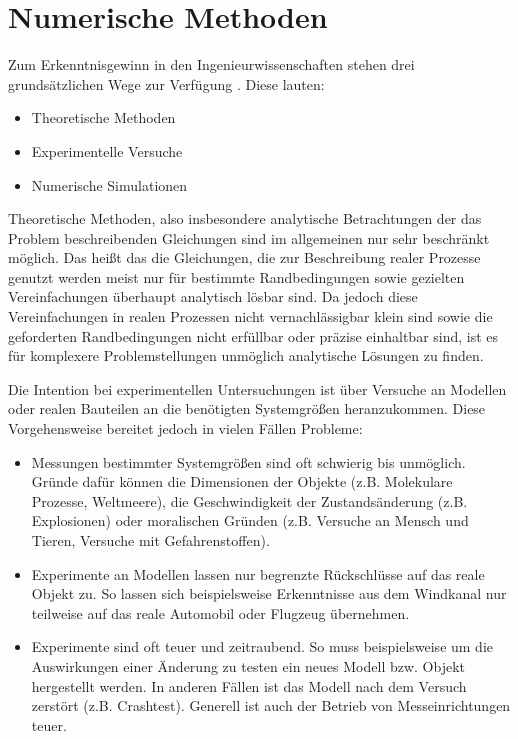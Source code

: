 \section{Numerische Methoden}

Zum Erkenntnisgewinn in den Ingenieurwissenschaften stehen drei grundsätzlichen
Wege zur Verfügung \cite{num_maschbau}. Diese lauten:
\begin{itemize}
  \item Theoretische Methoden
  \item Experimentelle Versuche
  \item Numerische Simulationen
\end{itemize}

Theoretische Methoden, also insbesondere analytische Betrachtungen der das Problem
beschreibenden Gleichungen sind im allgemeinen nur sehr beschränkt möglich. Das heißt das
die Gleichungen, die zur Beschreibung realer Prozesse genutzt werden meist nur für
bestimmte Randbedingungen sowie gezielten Vereinfachungen überhaupt analytisch lösbar
sind. Da jedoch diese Vereinfachungen in realen Prozessen nicht vernachlässigbar klein sind
sowie die geforderten Randbedingungen nicht erfüllbar oder präzise einhaltbar sind, ist es
für komplexere Problemstellungen unmöglich analytische Lösungen zu finden.

Die Intention bei experimentellen Untersuchungen ist über Versuche an Modellen oder
realen Bauteilen an die benötigten Systemgrößen heranzukommen. Diese Vorgehensweise
bereitet jedoch in vielen Fällen Probleme:
\begin{itemize}
  \item Messungen bestimmter Systemgrößen sind oft schwierig bis unmöglich. Gründe
    dafür können die Dimensionen der Objekte (z.B. Molekulare Prozesse, Weltmeere),
    die Geschwindigkeit der Zustandsänderung (z.B. Explosionen) oder moralischen Gründen
    (z.B. Versuche an Mensch und Tieren, Versuche mit Gefahrenstoffen).
  \item Experimente an Modellen lassen nur begrenzte Rückschlüsse auf das reale Objekt
    zu. So lassen sich beispielsweise Erkenntnisse aus dem Windkanal nur teilweise auf
    das reale Automobil oder Flugzeug übernehmen.
  \item Experimente sind oft teuer und zeitraubend. So muss beispielsweise um die Auswirkungen
    einer Änderung zu testen ein neues Modell bzw. Objekt hergestellt werden. In anderen Fällen
    ist das Modell nach dem Versuch zerstört (z.B. Crashtest). Generell ist auch der Betrieb
    von Messeinrichtungen teuer.
\end{itemize}

